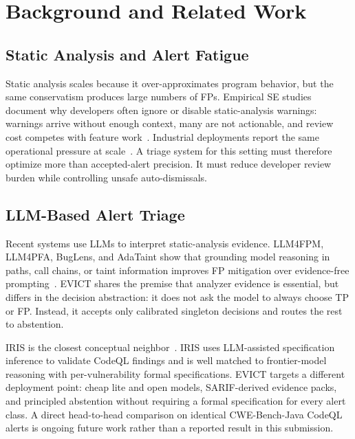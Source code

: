 \section{Background and Related Work}
\label{sec:background}

\subsection{Static Analysis and Alert Fatigue}

Static analysis scales because it over-approximates program behavior, but the same conservatism produces large numbers of FPs. Empirical SE studies document why developers often ignore or disable static-analysis warnings: warnings arrive without enough context, many are not actionable, and review cost competes with feature work~\cite{johnson2013,christakis2016}. Industrial deployments report the same operational pressure at scale~\cite{tencent2023}. A triage system for this setting must therefore optimize more than accepted-alert precision. It must reduce developer review burden while controlling unsafe auto-dismissals.

\subsection{LLM-Based Alert Triage}

Recent systems use LLMs to interpret static-analysis evidence. LLM4FPM, LLM4PFA, BugLens, and AdaTaint show that grounding model reasoning in paths, call chains, or taint information improves FP mitigation over evidence-free prompting~\cite{llm4fpm2024,llm4pfa2024,buglens2024,adataint2023}. EVICT shares the premise that analyzer evidence is essential, but differs in the decision abstraction: it does not ask the model to always choose TP or FP. Instead, it accepts only calibrated singleton decisions and routes the rest to abstention.

IRIS is the closest conceptual neighbor~\cite{li2025iris}. IRIS uses LLM-assisted specification inference to validate CodeQL findings and is well matched to frontier-model reasoning with per-vulnerability formal specifications. EVICT targets a different deployment point: cheap lite and open models, SARIF-derived evidence packs, and principled abstention without requiring a formal specification for every alert class. A direct head-to-head comparison on identical CWE-Bench-Java CodeQL alerts is ongoing future work rather than a reported result in this submission.

